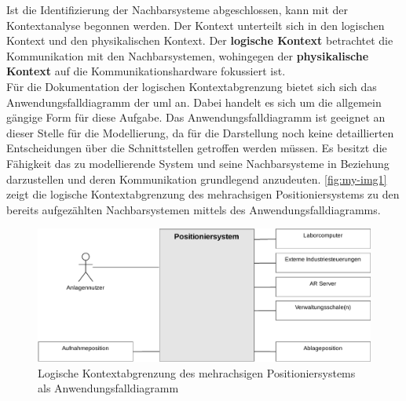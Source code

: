 \documentclass[../../../Bachelorarbeit.tex]{subfiles}
\begin{document}
Ist die Identifizierung der Nachbarsysteme abgeschlossen, kann mit der Kontextanalyse begonnen werden. Der Kontext unterteilt sich in den logischen Kontext und den physikalischen Kontext. Der \textbf{logische Kontext} betrachtet die Kommunikation mit den Nachbarsystemen, wohingegen der \textbf{physikalische Kontext} auf die Kommunikationshardware fokussiert ist.\\ %
Für die Dokumentation der logischen Kontextabgrenzung bietet sich sich das Anwendungsfalldiagramm der \ac{uml} an. Dabei handelt es sich um die allgemein gängige Form für diese Aufgabe. Das Anwendungsfalldiagramm ist geeignet an dieser Stelle für die Modellierung, da für die Darstellung noch keine detaillierten Entscheidungen über die Schnittstellen getroffen werden müssen. Es besitzt die Fähigkeit das zu modellierende System und seine Nachbarsysteme in Beziehung darzustellen und deren Kommunikation grundlegend anzudeuten. \autoref{fig:my-img1} zeigt die logische Kontextabgrenzung des mehrachsigen Positioniersystems zu den bereits aufgezählten Nachbarsystemen mittels des Anwendungsfalldiagramms.

\begin{figure}[H]
    \centering
    \includegraphics[width=\textwidth]{Images/kontextana.pdf}
    \caption[Logische Kontextabgrenzung]{Logische Kontextabgrenzung des mehrachsigen Positioniersystems als Anwendungsfalldiagramm}
    \label{fig:my-img1}
\end{figure}
\end{document}
